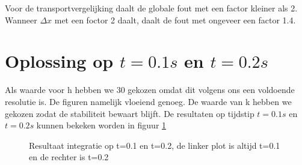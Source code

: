 \documentclass[11pt]{article} %
\begin{document}
Voor de transportvergelijking daalt de globale fout met een factor kleiner als 2. Wanneer $\Delta x$ met een foctor 2 daalt, daalt de fout met ongeveer een factor 1.4. 
		\begin{center}
			
		\end{center}
	
\section{Oplossing op $t=0.1s$ en $t=0.2s$}
Als waarde voor h hebben we 30 gekozen omdat dit volgens ons een voldoende resolutie is. De figuren namelijk vloeiend genoeg. De waarde van k hebben we gekozen zodat de stabiliteit bewaart blijft. De resultaten op tijdstip $t=0.1s$ en $t=0.2s$ kunnen bekeken worden in figuur \ref{fig:Deel4}\
	
	\begin{figure}[H]
		\centering
		\caption{Resultaat integratie op t=0.1 en t=0.2, de linker plot is altijd t=0.1 en de rechter is t=0.2}
			\label{fig:Deel4}
	\end{figure}
\end{document}
